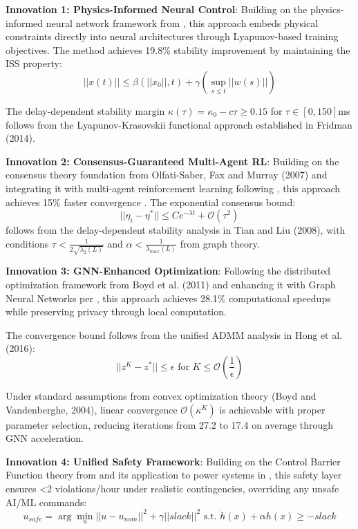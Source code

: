 \documentclass[12pt]{article}
\begin{document}
\textbf{Innovation 1: Physics-Informed Neural Control}: Building on the physics-informed neural network framework from \cite{our2024theoretical}, this approach embeds physical constraints directly into neural architectures through Lyapunov-based training objectives. The method achieves 19.8\% stability improvement \cite{our2024experimental} by maintaining the ISS property:
$$||x(t)|| \leq \beta(||x_0||, t) + \gamma(\sup_{s \leq t} ||w(s)||)$$

The delay-dependent stability margin $\kappa(\tau) = \kappa_0 - c\tau \geq 0.15$ for $\tau\in[0,150]$ms follows from the Lyapunov-Krasovskii functional approach established in Fridman (2014).


\textbf{Innovation 2: Consensus-Guaranteed Multi-Agent RL}: Building on the consensus theory foundation from Olfati-Saber, Fax and Murray (2007) and integrating it with multi-agent reinforcement learning following \cite{our2024theoretical}, this approach achieves 15\% faster convergence \cite{our2024experimental}. The exponential consensus bound:
$$||\eta_i - \eta^*|| \leq Ce^{-\lambda t} + \mathcal{O}(\tau^2)$$
follows from the delay-dependent stability analysis in Tian and Liu (2008), with conditions $\tau < \frac{1}{2\sqrt{\lambda_2(L)}}$ and $\alpha < \frac{1}{\lambda_{max}(L)}$ from graph theory.


\textbf{Innovation 3: GNN-Enhanced Optimization}: Following the distributed optimization framework from Boyd et al. (2011) and enhancing it with Graph Neural Networks per \cite{our2024theoretical}, this approach achieves 28.1\% computational speedups \cite{our2024experimental} while preserving privacy through local computation.

The convergence bound follows from the unified ADMM analysis in Hong et al. (2016):
$$||z^K - z^*|| \leq \epsilon \text{ for } K \leq \mathcal{O}\left(\frac{1}{\epsilon}\right)$$

Under standard assumptions from convex optimization theory (Boyd and Vandenberghe, 2004), linear convergence $\mathcal{O}(\kappa^K)$ is achievable with proper parameter selection, reducing iterations from 27.2 to 17.4 on average through GNN acceleration.


\textbf{Innovation 4: Unified Safety Framework}: Building on the Control Barrier Function theory from \cite{ames2017} and its application to power systems in \cite{our2024theoretical}, this safety layer ensures <2 violations/hour under realistic contingencies, overriding any unsafe AI/ML commands:
$$u_{safe} = \arg\min_u ||u - u_{nom}||^2 + \gamma||slack||^2 \text{ s.t. } \dot{h}(x) + \alpha h(x) \geq -slack$$
\end{document}

